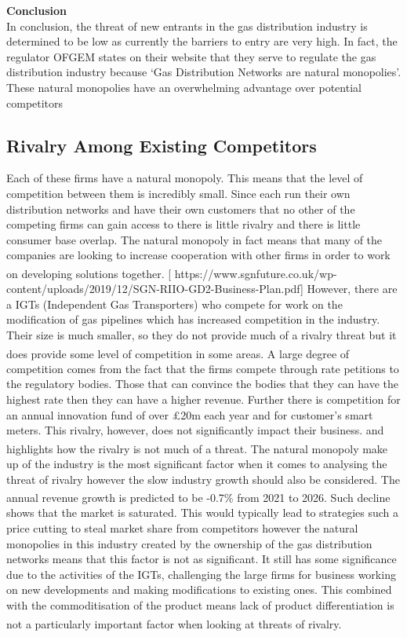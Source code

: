 \documentclass[11pt]{article}		%
\newcommand{\supercite}[1]{\textsuperscript{\cite{#1}}}		%
\begin{document}
			    \textbf{Conclusion}\\
                In conclusion, the threat of new entrants in the gas distribution industry is determined to be low as currently the barriers to entry are very high. In fact, the regulator OFGEM states on their website that they serve to regulate the gas distribution industry because ‘Gas Distribution Networks are natural monopolies’. These natural monopolies have an overwhelming advantage over potential competitors
        \subsection[Rivalry Among Existing Competitors]{Rivalry Among Existing Competitors}
                Each of these firms have a natural monopoly. This means that the level of competition between them is incredibly small. Since each run their own distribution networks and have their own customers that no other of the competing firms can gain access to there is little rivalry and there is little consumer base overlap. The natural monopoly in fact means that many of the companies are looking to increase cooperation with other firms in order to work on developing solutions together.\supercite{SGN-GD2} [  https://www.sgnfuture.co.uk/wp-content/uploads/2019/12/SGN-RIIO-GD2-Business-Plan.pdf]
                However, there are a IGTs (Independent Gas Transporters) who compete for work on the modification of gas pipelines which has increased competition in the industry. Their size is much smaller, so they do not provide much of a rivalry threat but it does provide some level of competition in some areas.\supercite{Gas_Distribution_Industry} 
                A large degree of competition comes from the fact that the firms compete through rate petitions to the regulatory bodies. Those that can convince the bodies that they can have the highest rate then they can have a higher revenue. Further there is competition for an annual innovation fund of over £20m each year and for customer’s smart meters. This rivalry, however, does not significantly impact their business. and highlights how the rivalry is not much of a threat.\supercite{Gas_Distribution_Industry}
                The natural monopoly make up of the industry is the most significant factor when it comes to analysing the threat of rivalry however the slow industry growth should also be considered. The annual revenue growth is predicted to be -0.7\% from 2021 to 2026.\supercite{Gas_Distribution_Industry} Such decline shows that the market is saturated. This would typically lead to strategies such a price cutting to steal market share from competitors however the natural monopolies in this industry created by the ownership of the gas distribution networks means that this factor is not as significant. It still has some significance due to the activities of the IGTs, challenging the large firms for business working on new developments and making modifications to existing ones. This combined with the commoditisation of the product means lack of product differentiation is not a particularly important factor when looking at threats of rivalry.\supercite{Gas_Distribution_Industry}
\end{document}
